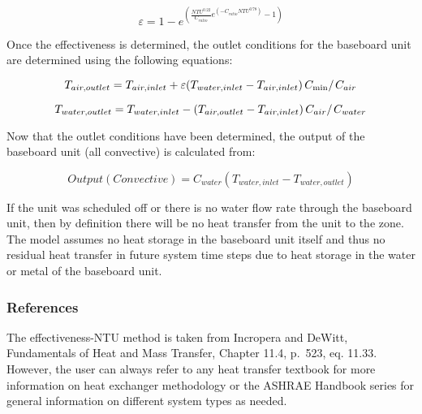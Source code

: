 \begin{equation}
\varepsilon  = 1 - {e^{\left( {\frac{{NT{U^{0.22}}}}{{{C_{ratio}}}}{e^{\left( { - {C_{ratio}}NT{U^{0.78}}} \right)}} - 1} \right)}}
\end{equation}

Once the effectiveness is determined, the outlet conditions for the baseboard unit are determined using the following equations:

\begin{equation}
{T_{air,outlet}} = {T_{air,inlet}} + \varepsilon {{\left( {{T_{water,inlet}} - {T_{air,inlet}}} \right){C_{\min }}} \mathord{\left/ {\vphantom {{\left( {{T_{water,inlet}} - {T_{air,inlet}}} \right){C_{\min }}} {{C_{air}}}}} \right. } {{C_{air}}}}
\end{equation}

\begin{equation}
{T_{water,outlet}} = {T_{water,inlet}} - \left( {{T_{air,outlet}} - {T_{air,inlet}}} \right){{{C_{air}}} \mathord{\left/ {\vphantom {{{C_{air}}} {{C_{water}}}}} \right. } {{C_{water}}}}
\end{equation}

Now that the outlet conditions have been determined, the output of the baseboard unit (all convective) is calculated from:

\begin{equation}
Output\left( {Convective} \right) = {C_{water}}\left( {{T_{water,inlet}} - {T_{water,outlet}}} \right)
\end{equation}

If the unit was scheduled off or there is no water flow rate through the baseboard unit, then by definition there will be no heat transfer from the unit to the zone. The model assumes no heat storage in the baseboard unit itself and thus no residual heat transfer in future system time steps due to heat storage in the water or metal of the baseboard unit.

\subsubsection{References}\label{references-006}

The effectiveness-NTU method is taken from Incropera and DeWitt, Fundamentals of Heat and Mass Transfer, Chapter 11.4, p.~523, eq. 11.33. However, the user can always refer to any heat transfer textbook for more information on heat exchanger methodology or the ASHRAE Handbook series for general information on different system types as needed.

